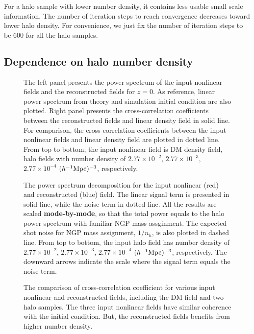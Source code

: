 \documentclass[iop]{emulateapj}
\newcommand{\mpch}{h^{-1} {\rm Mpc}}
\begin{document}
{For a halo sample with lower number density, it contains less usable small scale information.
The number of iteration steps to reach convergence decreases toward lower halo density.
For convenience, we just fix the number of iteration steps to be 600 for all the halo samples.

\subsection{Dependence on halo number density}
\label{sec:numberdensity}

\begin{figure*}
\epsfxsize=8.5cm
\epsfxsize=8.5cm
\caption{The left panel presents the power spectrum of the input nonlinear fields and the reconstructed fields for $z=0$.
As reference, linear power spectrum from theory and simulation initial condition are also plotted.
Right panel presents the cross-correlation coefficients between the reconstructed fields and linear density field in solid line.
For comparison, the cross-correlation coefficients between the input nonlinear fields and linear density field are plotted in dotted line.
From top to bottom, the input nonlinear field is DM density field, halo fields with number density of $2.77\times 10^{-2}$, $2.77\times 10^{-3}$, $2.77\times 10^{-4}$ $(\mpch)^{-3}$, respectively.}
\label{fig:powercc}
\end{figure*}

\begin{figure}
\epsfxsize=8.5cm
\caption{The power spectrum decomposition for the input nonlinear (red) and reconstructed (blue) field.
The linear signal term is presented in solid line, while the noise term in dotted line.
All the results are scaled {\bf mode-by-mode}, so that the total power equals to the halo power spectrum with familiar NGP mass assginment.
The expected shot noise for NGP mass assignment, $1/n_h$, is also plotted in dashed line.
From top to bottom, the input halo field has number density of $2.77\times 10^{-2}$, $2.77\times 10^{-3}$, $2.77\times 10^{-4}$ $(\mpch)^{-3}$, respectively.
The downward arrows indicate the scale where the signal term equals the noise term.}
\label{fig:decom}
\end{figure}

\begin{figure}
\epsfxsize=8.5cm
\caption{The comparison of cross-correlation coefficient for various input nonlinear and reconstructed fields, including
the DM field and two halo samples.
The three input nonlinear fields have similar coherence with the initial condition.
But, the reconstructed fields benefits from higher number density.}
\label{fig:ccnh}
\end{figure}

}
\end{document}
